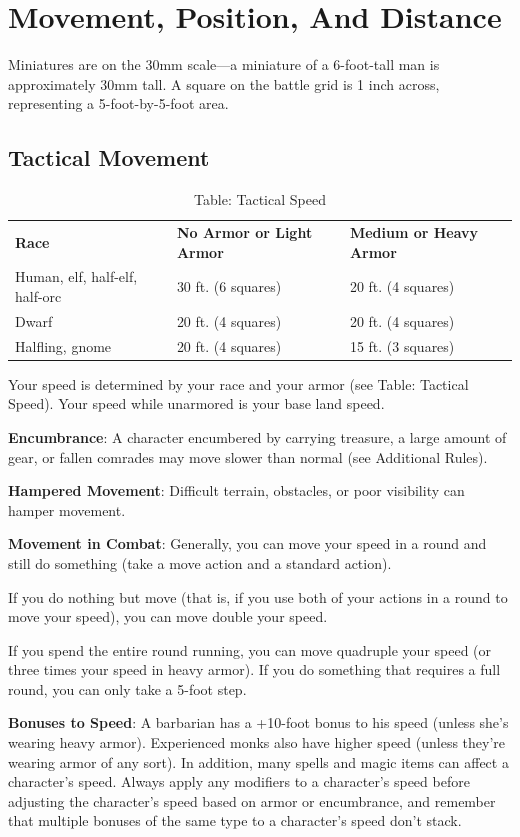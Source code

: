 \section{Movement, Position, And Distance}

				
Miniatures are on the 30mm scale---a miniature of a 6-foot-tall man is approximately 30mm tall. A square on the battle grid is 1 inch across, representing a 5-foot-by-5-foot area.
				
\subsection{Tactical Movement}

\begin{table}[]
\sffamily
\caption{Table: Tactical Speed}
\begin{tabular}{lll}
\textbf{Race} & \textbf{No Armor or Light Armor} & \textbf{Medium or Heavy Armor}\\
Human, elf, half-elf, half-orc & 30 ft. (6 squares) & 20 ft. (4 squares) \\
 Dwarf & 20 ft. (4 squares) & 20 ft. (4 squares) \\
 Halfling, gnome & 20 ft. (4 squares) & 15 ft. (3 squares)\\
\end{tabular}
\end{table}			
Your speed is determined by your race and your armor (see Table: Tactical Speed). Your speed while unarmored is your base land speed.
				
\textbf{Encumbrance}: A character encumbered by carrying treasure, a large amount of gear, or fallen comrades may move slower than normal (see Additional Rules).
				
\textbf{Hampered Movement}: Difficult terrain, obstacles, or poor visibility can hamper movement.
				
\textbf{Movement in Combat}: Generally, you can move your speed in a round and still do something (take a move action and a standard action).
				
If you do nothing but move (that is, if you use both of your actions in a round to move your speed), you can move double your speed.
				
If you spend the entire round running, you can move quadruple your speed (or three times your speed in heavy armor). If you do something that requires a full round, you can only take a 5-foot step.
				
\textbf{Bonuses to Speed}: A barbarian has a +10-foot bonus to his speed (unless she's wearing heavy armor). Experienced monks also have higher speed (unless they're wearing armor of any sort). In addition, many spells and magic items can affect a character's speed. Always apply any modifiers to a character's speed before adjusting the character's speed based on armor or encumbrance, and remember that multiple bonuses of the same type to a character's speed don't stack.
				
